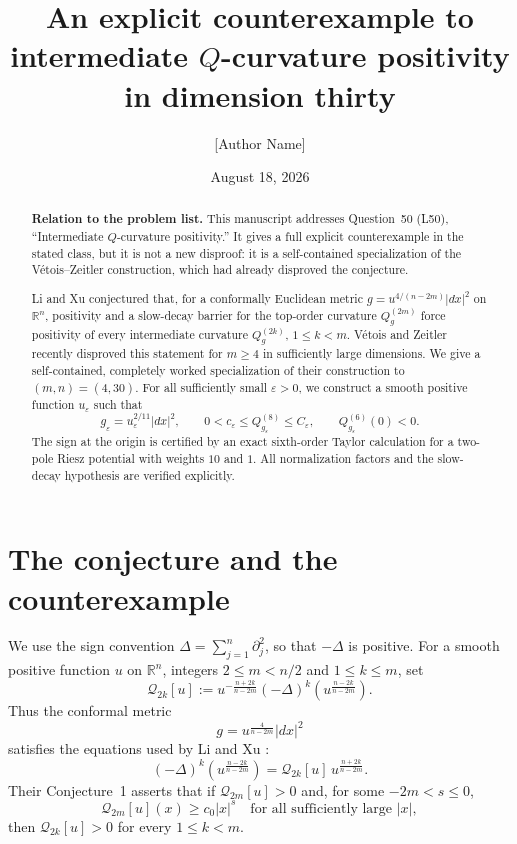 \documentclass[11pt,reqno]{amsart}
\title[Intermediate $Q$-curvature positivity fails]
{An explicit counterexample to intermediate
$Q$-curvature positivity in dimension thirty}
\author{[Author Name]}
\date{August 18, 2026}
\theoremstyle{remark}
\newcommand{\R}{\mathbb{R}}
\newcommand{\Qlx}{\mathcal{Q}}
\newcommand{\eps}{\varepsilon}
\begin{document}
\begin{abstract}
\textbf{Relation to the problem list.}
This manuscript addresses Question~50 (L50), ``Intermediate $Q$-curvature
positivity.''  It gives a full explicit counterexample in the stated class,
but it is not a new disproof: it is a self-contained specialization of the
V\'etois--Zeitler construction, which had already disproved the conjecture.

Li and Xu conjectured that, for a conformally Euclidean metric
\(g=u^{4/(n-2m)}|dx|^2\) on \(\R^n\), positivity and a slow-decay
barrier for the top-order curvature \(Q_g^{(2m)}\) force positivity of
every intermediate curvature \(Q_g^{(2k)}\), \(1\leq k<m\).
V\'etois and Zeitler recently disproved this statement for \(m\geq4\)
in sufficiently large dimensions.  We give a self-contained, completely
worked specialization of their construction to \((m,n)=(4,30)\).
For all sufficiently small \(\eps>0\), we construct a smooth positive
function \(u_\eps\) such that
\[
 g_\eps=u_\eps^{2/11}|dx|^2,
 \qquad 0<c_\eps\leq Q_{g_\eps}^{(8)}\leq C_\eps,
 \qquad Q_{g_\eps}^{(6)}(0)<0.
\]
The sign at the origin is certified by an exact sixth-order Taylor
calculation for a two-pole Riesz potential with weights \(10\) and \(1\).
All normalization factors and the slow-decay hypothesis are verified
explicitly.
\end{abstract}

\maketitle

\section{The conjecture and the counterexample}

We use the sign convention
\(\Delta=\sum_{j=1}^n\partial_j^2\), so that \(-\Delta\) is positive.
For a smooth positive function \(u\) on \(\R^n\), integers
\(2\leq m<n/2\) and \(1\leq k\leq m\), set
\begin{equation}\label{eq:LX-definition}
 \Qlx_{2k}[u]
 :=u^{-\frac{n+2k}{n-2m}}
   (-\Delta)^k\!\left(u^{\frac{n-2k}{n-2m}}\right).
\end{equation}
Thus the conformal metric
\[
 g=u^{\frac{4}{n-2m}}|dx|^2
\]
satisfies the equations used by Li and Xu \cite[(1.1)--(1.2)]{LiXu}:
\[
 (-\Delta)^k\!\left(u^{\frac{n-2k}{n-2m}}\right)
 =\Qlx_{2k}[u]\,u^{\frac{n+2k}{n-2m}}.
\]
Their Conjecture~1 asserts that if \(\Qlx_{2m}[u]>0\) and, for some
\(-2m<s\leq0\),
\begin{equation}\label{eq:barrier}
 \Qlx_{2m}[u](x)\geq c_0|x|^s
 \quad\text{for all sufficiently large }|x|,
\end{equation}
then \(\Qlx_{2k}[u]>0\) for every \(1\leq k<m\).
\end{document}
